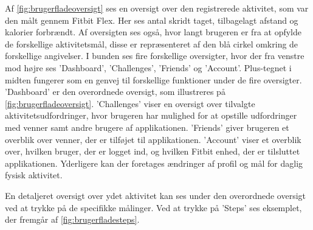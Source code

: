 \noindent
Af \autoref{fig:brugerfladeoversigt} ses en oversigt over den registrerede aktivitet, som var den målt gennem Fitbit Flex. Her ses antal skridt taget, tilbagelagt afstand og kalorier forbrændt. Af oversigten ses også, hvor langt brugeren er fra at opfylde de forskellige aktivitetsmål, disse er repræsenteret af den blå cirkel omkring de forskellige angivelser. 
I bunden ses fire forskellige oversigter, hvor der fra venstre mod højre ses 'Dashboard', 'Challenges', 'Friends' og 'Account'. Plus-tegnet i midten fungerer som en genvej til forskellige funktioner under de fire oversigter. 
'Dashboard' er den overordnede oversigt, som illustreres på \autoref{fig:brugerfladeoversigt}.
'Challenges' viser en oversigt over tilvalgte aktivitetsudfordringer, hvor brugeren har mulighed for at opstille udfordringer med venner samt andre brugere af applikationen. 
'Friends' giver brugeren et overblik over venner, der er tilføjet til applikationen. 
'Account' viser et overblik over, hvilken bruger, der er logget ind, og hvilken Fitbit enhed, der er tilsluttet applikationen. Yderligere kan der foretages ændringer af profil og mål for daglig fysisk aktivitet. 

En detaljeret oversigt over ydet aktivitet kan ses under den overordnede oversigt ved at trykke på de specifikke målinger. Ved at trykke på 'Steps' ses eksemplet, der fremgår af \autoref{fig:brugerfladesteps}.  

